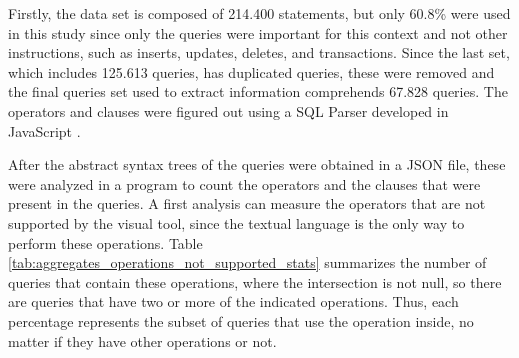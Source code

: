 Firstly, the data set is composed of 214.400 statements, but only 60.8\% were used in this study since only the queries were important for this context and not other instructions, such as inserts, updates, deletes, and transactions. Since the last set, which includes 125.613 queries, has duplicated queries, these were removed and the final queries set used to extract information comprehends 67.828 queries. The operators and clauses were figured out using a \gls{SQL} Parser developed in JavaScript \cite{jsSqlParser}.

After the abstract syntax trees of the queries were obtained in a JSON file, these were analyzed in a program to count the operators and the clauses that were present in the queries. A first analysis can measure the operators that are not supported by the visual tool, since the textual language is the only way to perform these operations. Table \ref{tab:aggregates_operations_not_supported_stats} summarizes the number of queries that contain these operations, where the intersection is not null, so there are queries that have two or more of the indicated operations. Thus, each percentage represents the subset of queries that use the operation inside, no matter if they have other operations or not.


\begin{table}[tb]
	\caption{Queries that contain operations not supported by Aggregates}
	\label{tab:aggregates_operations_not_supported_stats}
\centering
{}
\end{table}

